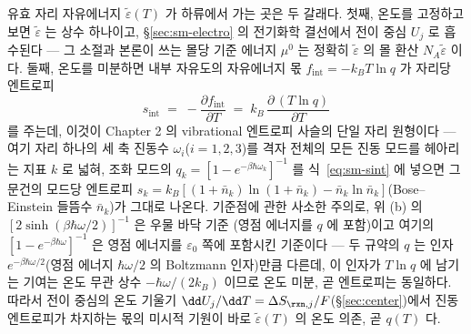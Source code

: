 유효 자리 자유에너지 $\tilde\varepsilon(T)$ 가 하류에서 가는 곳은 두 갈래다. 첫째, 온도를 고정하고 보면
$\tilde\varepsilon$ 는 상수 하나이고, \S\ref{sec:sm-electro} 의 전기화학 결선에서 전이 중심 $U_j$ 로
흡수된다 --- 그 소절과 본론이 쓰는 몰당 기준 에너지 $\mu^0$ 는 정확히 $\tilde\varepsilon$ 의 몰 환산
$N_A\tilde\varepsilon$ 이다. 둘째, 온도를 미분하면 내부 자유도의 자유에너지 몫
$f_\mathrm{int}=-k_BT\ln q$ 가 자리당 엔트로피
\begin{equation}
s_\mathrm{int}\;=\;-\frac{\partial f_\mathrm{int}}{\partial T}
\;=\;k_B\,\frac{\partial\,(T\ln q)}{\partial T}
\label{eq:sm-sint}
\end{equation}
를 주는데, 이것이 Chapter 2 의 vibrational 엔트로피 사슬의 단일 자리 원형이다 --- 여기 자리 하나의
세 축 진동수 $\omega_i$($i=1,2,3$)를 격자 전체의 모든 진동 모드를 헤아리는 지표 $k$ 로 넓혀, 조화 모드의
$q_k=[1-e^{-\beta\hbar\omega_k}]^{-1}$ 를 식~\eqref{eq:sm-sint} 에 넣으면 그 문건의 모드당 엔트로피
$s_k=k_B[(1+\bar n_k)\ln(1+\bar n_k)-\bar n_k\ln\bar n_k]$(Bose--Einstein 들뜸수 $\bar n_k$)가 그대로
나온다. 기준점에 관한 사소한 주의로, 위 (b) 의 $[2\sinh(\beta\hbar\omega/2)]^{-1}$ 은 우물 바닥 기준
(영점 에너지를 $q$ 에 포함)이고 여기의 $[1-e^{-\beta\hbar\omega}]^{-1}$ 은 영점 에너지를
$\varepsilon_0$ 쪽에 포함시킨 기준이다 --- 두 규약의 $q$ 는 인자 $e^{-\beta\hbar\omega/2}$(영점 에너지
$\hbar\omega/2$ 의 Boltzmann 인자)만큼 다른데, 이 인자가 $T\ln q$ 에 남기는 기여는 온도 무관 상수
$-\hbar\omega/(2k_B)$ 이므로 온도 미분, 곧 엔트로피는 동일하다. 따라서 전이 중심의 온도 기울기
$\dd U_j/\dd T=\Delta S_{\rxn,j}/F$(\S\ref{sec:center})에서 진동
엔트로피가 차지하는 몫의 미시적 기원이 바로 $\tilde\varepsilon(T)$ 의 온도 의존, 곧 $q(T)$ 다.
